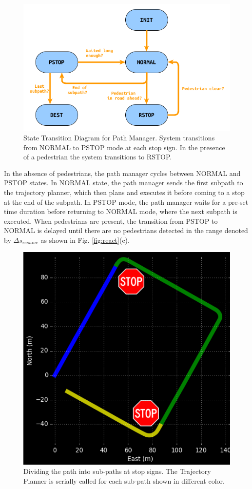 \documentclass[letterpaper, 10 pt, conference]{ieeeconf}  %
\begin{document}
\begin{figure}[tb]
  \centering
  \includegraphics[width=1.0\columnwidth]{graphics/StateMachineSimple.png}
  \caption{State Transition Diagram for Path Manager. System transitions from NORMAL to PSTOP mode at each stop sign. In the presence of a pedestrian the system transitions to RSTOP.}
  \label{fig:st}
\end{figure}

In the absence of pedestrians, the path manager cycles between NORMAL and PSTOP states.
In NORMAL state, the path manager sends the first subpath to the trajectory planner, which then plans and executes it before coming to a stop at the end of the subpath.
In PSTOP mode, the path manager waits for a pre-set time duration before returning to NORMAL mode, where the next subpath is executed.
When pedestrians are present, the transition from PSTOP to NORMAL is delayed until there are no pedestrians detected in the range denoted by $\Delta s_{resume}$ as shown in Fig. \ref{fig:react}(c).

\begin{figure}[tb]
  \centering
  \includegraphics[width=0.5\columnwidth]{graphics/Subpaths.png}
  \caption{
    Dividing the path into sub-paths at stop signs.
    The Trajectory Planner is serially called for each sub-path shown in different color.
  }
  \label{fig:subpathdivision}
\end{figure}
\end{document}
